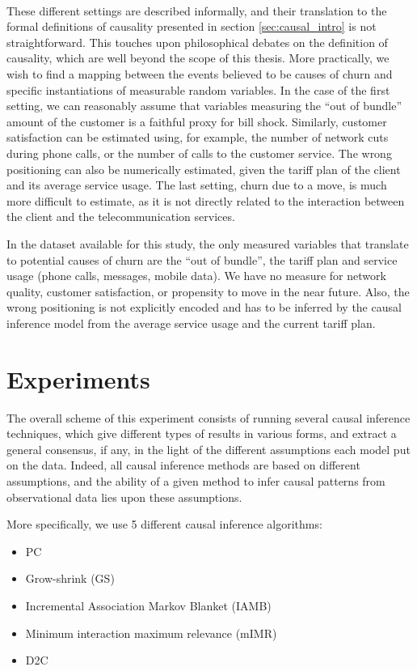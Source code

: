 \paragraph{} These different settings are described informally, and their
translation to the formal definitions of causality presented in section
\ref{sec:causal_intro} is not straightforward. This touches upon philosophical
debates on the definition of causality, which are well beyond the scope of this
thesis. More practically, we wish to find a mapping between the events believed
to be causes of churn and specific instantiations of measurable random
variables. In the case of the first setting, we can reasonably assume that
variables measuring the ``out of bundle'' amount of the customer is a faithful proxy
for bill shock.  Similarly, customer satisfaction can be estimated using,
for example, the number of network cuts during phone calls, or the number of
calls to the customer service. The wrong positioning can also be numerically
estimated, given the tariff plan of the client and its average service usage.
The last setting, churn due to a move, is much more difficult to estimate, as it
is not directly related to the interaction between the client and the
telecommunication services.

In the dataset available for this study, the only measured variables that
translate to potential causes of churn are the ``out of bundle'', the tariff plan
and service usage (phone calls, messages, mobile data). We have no measure
for network quality, customer satisfaction, or propensity to move in the near
future. Also, the wrong positioning is not explicitly encoded and has to be
inferred by the causal inference model from the average service usage and the
current tariff plan.

\section{Experiments}
\label{sec:causal_experiments}

The overall scheme of this experiment consists of running several causal
inference techniques, which give different types of results in various forms,
and extract a general consensus, if any, in the light of the different
assumptions each model put on the data. Indeed, all causal inference methods are
based on different assumptions, and the ability of a given method to infer
causal patterns from observational data lies upon these assumptions.

More specifically, we use 5 different causal inference algorithms:
\noprelistbreak
\begin{itemize}
    \item PC
	\item Grow-shrink (GS)
	\item Incremental Association Markov Blanket (IAMB)
	\item Minimum interaction maximum relevance (mIMR)
	\item D2C
\end{itemize}

